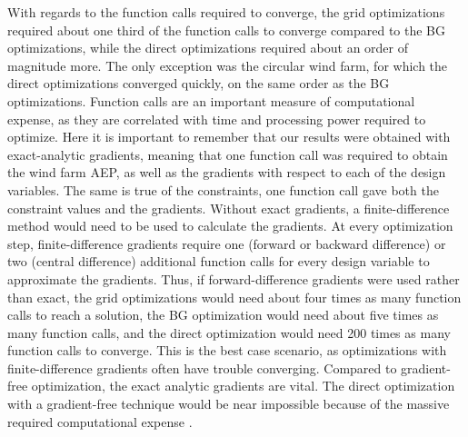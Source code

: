 \documentclass[wes, manuscript]{copernicus}
\begin{document}
With regards to the function calls required to converge, the grid optimizations required about one third of the function calls to converge compared to the BG optimizations, while the direct optimizations required about an order of magnitude more. 
The only exception was the circular wind farm, for which the direct optimizations converged quickly, on the same order as the BG optimizations.
Function calls are an important measure of computational expense, as they are correlated with time and processing power required to optimize. Here it is important to remember that our results were obtained with exact-analytic gradients, meaning that one function call was required to obtain the wind farm AEP, as well as the gradients with respect to each of the design variables. The same is true of the constraints, one function call gave both the constraint values and the gradients. Without exact gradients, a finite-difference method would need to be used to calculate the gradients. At every optimization step, finite-difference gradients require one (forward or backward difference) or two (central difference) additional function calls for every design variable to approximate the gradients. Thus, if forward-difference gradients were used rather than exact, the grid optimizations would need about four times as many function calls to reach a solution, the BG optimization would need about five times as many function calls, and the direct optimization would need 200 times as many function calls to converge. This is the best case scenario, as optimizations with finite-difference gradients often have trouble converging. Compared to gradient-free optimization, the exact analytic gradients are vital. The direct optimization with a gradient-free technique would be near impossible because of the massive required computational expense \citep{Ning2016a,Thomas2018}.
\end{document}
